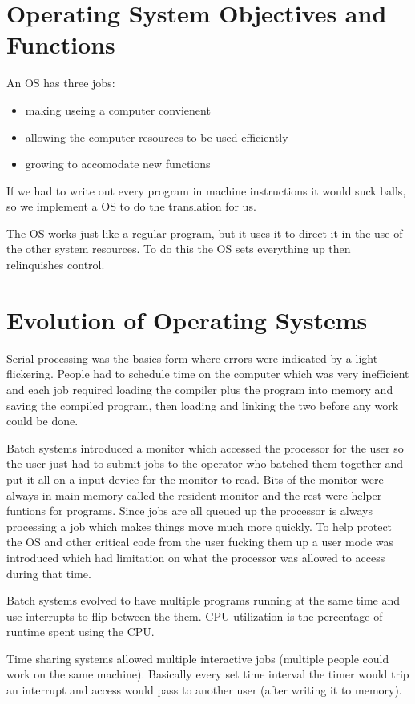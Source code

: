 \documentclass[12pt]{article}
\begin{document}

\section{Operating System Objectives and Functions}
An OS has three jobs:
\begin{itemize}
    \item making useing a computer convienent
    \item allowing the computer resources to be used efficiently
    \item growing to accomodate new functions
\end{itemize}

If we had to write out every program in machine instructions it would suck balls, so we implement a OS to do the translation for us.

The OS works just like a regular program, but it uses it to direct it in the use of the other system resources. To do this the OS sets everything up then relinquishes control.

\section{Evolution of Operating Systems}
Serial processing was the basics form where errors were indicated by a light flickering. People had to schedule time on the computer which was very inefficient and each job required loading the compiler plus the program into memory and saving the compiled program, then loading and linking the two before any work could be done.

Batch systems introduced a monitor which accessed the processor for the user so the user just had to submit jobs to the operator who batched them together and put it all on a input device for the monitor to read. Bits of the monitor were always in main memory called the resident monitor and the rest were helper funtions for programs. Since jobs are all queued up the processor is always processing a job which makes things move much more quickly. To help protect the OS and other critical code from the user fucking them up a user mode was introduced which had limitation on what the processor was allowed to access during that time.

Batch systems evolved to have multiple programs running at the same time and use interrupts to flip between the them. CPU utilization is the percentage of runtime spent using the CPU.

Time sharing systems allowed multiple interactive jobs (multiple people could work on the same machine). Basically every set time interval the timer would trip an interrupt and access would pass to another user (after writing it to memory).
\end{document}

